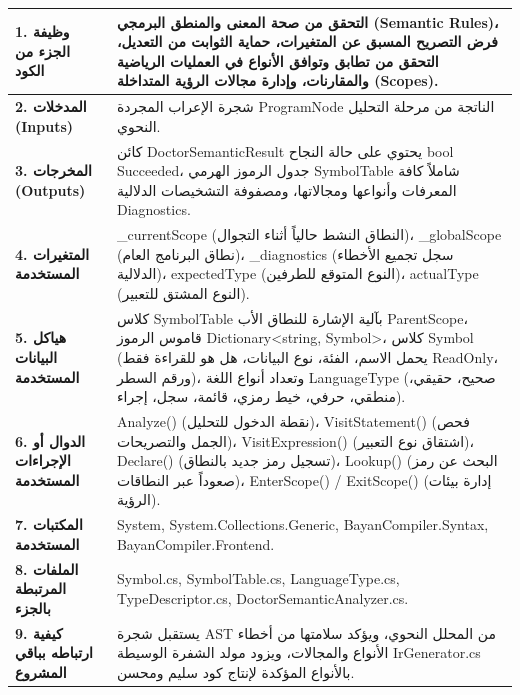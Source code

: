 \documentclass[12pt,a4paper]{report}
\begin{document}
\begin{tcolorbox}[colback=white,colframe=vscodeBlue!80!black,arc=2mm,title=\textbf{بطاقة المواصفات البرمجية للتحليل الدلالي (Semantic Analyzer Specification)}]
\begin{tabularx}{\linewidth}{p{4.2cm} X}
    \textbf{1. وظيفة الجزء من الكود} & التحقق من صحة المعنى والمنطق البرمجي (Semantic Rules)، فرض التصريح المسبق عن المتغيرات، حماية الثوابت من التعديل، التحقق من تطابق وتوافق الأنواع في العمليات الرياضية والمقارنات، وإدارة مجالات الرؤية المتداخلة (Scopes). \\
    \midrule
    \textbf{2. المدخلات (Inputs)} & شجرة الإعراب المجردة \textenglish{ProgramNode} الناتجة من مرحلة التحليل النحوي. \\
    \midrule
    \textbf{3. المخرجات (Outputs)} & كائن \textenglish{DoctorSemanticResult} يحتوي على حالة النجاح \textenglish{bool Succeeded}، جدول الرموز الهرمي \textenglish{SymbolTable} شاملاً كافة المعرفات وأنواعها ومجالاتها، ومصفوفة التشخيصات الدلالية \textenglish{Diagnostics}. \\
    \midrule
    \textbf{4. المتغيرات المستخدمة} & \textenglish{\_currentScope} (النطاق النشط حالياً أثناء التجوال)، \textenglish{\_globalScope} (نطاق البرنامج العام)، \textenglish{\_diagnostics} (سجل تجميع الأخطاء الدلالية)، \textenglish{expectedType} (النوع المتوقع للطرفين)، \textenglish{actualType} (النوع المشتق للتعبير). \\
    \midrule
    \textbf{5. هياكل البيانات المستخدمة} & كلاس \textenglish{SymbolTable} بآلية الإشارة للنطاق الأب \textenglish{ParentScope}، قاموس الرموز \textenglish{Dictionary\textless string, Symbol\textgreater}، كلاس \textenglish{Symbol} (يحمل الاسم، الفئة، نوع البيانات، هل هو للقراءة فقط ReadOnly، ورقم السطر)، وتعداد أنواع اللغة \textenglish{LanguageType} (صحيح، حقيقي، منطقي، حرفي، خيط رمزي، قائمة، سجل، إجراء). \\
    \midrule
    \textbf{6. الدوال أو الإجراءات المستخدمة} & \textenglish{Analyze()} (نقطة الدخول للتحليل)، \textenglish{VisitStatement()} (فحص الجمل والتصريحات)، \textenglish{VisitExpression()} (اشتقاق نوع التعبير)، \textenglish{Declare()} (تسجيل رمز جديد بالنطاق)، \textenglish{Lookup()} (البحث عن رمز صعوداً عبر النطاقات)، \textenglish{EnterScope() / ExitScope()} (إدارة بيئات الرؤية). \\
    \midrule
    \textbf{7. المكتبات المستخدمة} & \textenglish{System, System.Collections.Generic, BayanCompiler.Syntax, BayanCompiler.Frontend}. \\
    \midrule
    \textbf{8. الملفات المرتبطة بالجزء} & \textenglish{Symbol.cs, SymbolTable.cs, LanguageType.cs, TypeDescriptor.cs, DoctorSemanticAnalyzer.cs}. \\
    \midrule
    \textbf{9. كيفية ارتباطه بباقي المشروع} & يستقبل شجرة AST من المحلل النحوي، ويؤكد سلامتها من أخطاء الأنواع والمجالات، ويزود مولد الشفرة الوسيطة \textenglish{IrGenerator.cs} بالأنواع المؤكدة لإنتاج كود سليم ومحسن. \\
\end{tabularx}
\end{tcolorbox}
\end{document}
